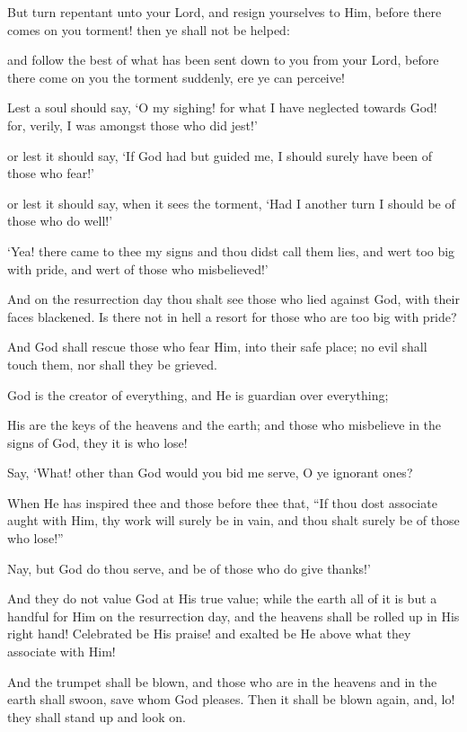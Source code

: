 \documentclass[fontsize=14pt, letterpaper, notitlepage, openany, DIV=12]{scrbook} %
\begin{document}
\noindent[39:54]
But turn repentant unto your Lord, and resign yourselves to Him, before there comes on
you torment! then ye shall not be helped:

\noindent[39:55]
and follow the best of what has been sent down to you from your Lord, before there come
on you the torment suddenly, ere ye can perceive!

\noindent[39:56]
Lest a soul should say, `O my sighing! for what I have neglected towards God! for,
verily, I was amongst those who did jest!'

\noindent[39:57]
or lest it should say, `If God had but guided me, I should surely have been of those who
fear!'

\noindent[39:58]
or lest it should say, when it sees the torment, `Had I another turn I should be of those
who do well!'

\noindent[39:59]
`Yea! there came to thee my signs and thou didst call them lies, and wert too big with
pride, and wert of those who misbelieved!'

\noindent[39:60]
And on the resurrection day thou shalt see those who lied against God, with their faces
blackened. Is there not in hell a resort for those who are too big with pride?

\noindent[39:61]
And God shall rescue those who fear Him, into their safe place; no evil shall touch them,
nor shall they be grieved.

\noindent[39:62]
God is the creator of everything, and He is guardian over everything;

\noindent[39:63]
His are the keys of the heavens and the earth; and those who misbelieve in the signs of
God, they it is who lose!

\noindent[39:64]
Say, `What! other than God would you bid me serve, O ye ignorant ones?

\noindent[39:65]
When He has inspired thee and those before thee that, ``If thou dost associate aught with
Him, thy work will surely be in vain, and thou shalt surely be of those who lose!''

\noindent[39:66]
Nay, but God do thou serve, and be of those who do give thanks!'

\noindent[39:67]
And they do not value God at His true value; while the earth all of it is but a handful for
Him on the resurrection day, and the heavens shall be rolled up in His right hand! Celebrated be
His praise! and exalted be He above what they associate with Him!

\noindent[39:68]
And the trumpet shall be blown, and those who are in the heavens and in the earth shall
swoon, save whom God pleases. Then it shall be blown again, and, lo! they shall stand up and
look on.
\end{document}
